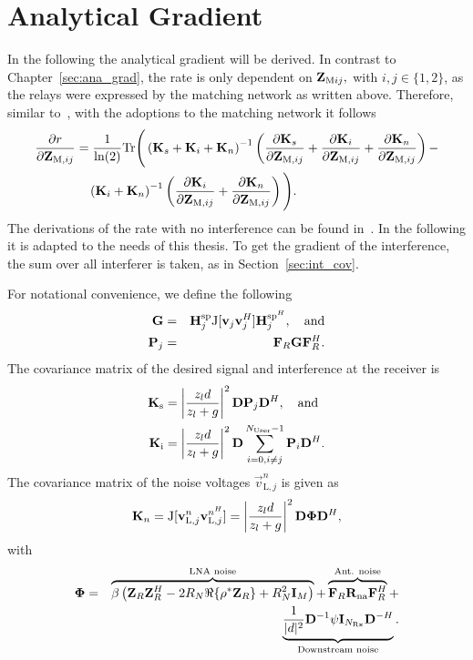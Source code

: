 \section{Analytical Gradient}
In the following the analytical gradient will be derived.
In contrast to Chapter~\ref{sec:ana_grad}, the rate is only dependent on $\mathbf{Z}_{\text{M}ij},$ with $i,j\in\{1,2\}$, as the relays were expressed by the matching network as written above.
Therefore, similar to~\cite{Yahia2013}, with the adoptions to the matching network it follows
\begin{align}
\label{eq:gradient}\nonumber
\frac{\partial r}{\partial\mathbf{Z}_{\text{M},ij}} &= \frac{1}{\text{ln}(2)} 
\text{Tr}\Bigg(\left(\mathbf{K}_s + \mathbf{K}_i + \mathbf{K}_n\right)^{-1}
\left(\frac{\partial\mathbf{K}_s}{\partial\mathbf{Z}_{\text{M},ij}}+
 \frac{\partial\mathbf{K}_i}{\partial\mathbf{Z}_{\text{M},ij}}+
 \frac{\partial\mathbf{K}_n}{\partial\mathbf{Z}_{\text{M},ij}}\right)-\\
 &\quad\left(\mathbf{K}_i+\mathbf{K}_n\right)^{-1}
 \left(\frac{\partial\mathbf{K}_i}{\partial\mathbf{Z}_{\text{M},ij}}+
 	\frac{\partial\mathbf{K}_n}{\partial\mathbf{Z}_{\text{M},ij}}\right)\Bigg).
\end{align}
The derivations of the rate with no interference can be found in~\cite{Yahia2013}.
In the following it is adapted to the needs of this thesis.
To get the gradient of the interference, the sum over all interferer is taken, as in Section~\ref{sec:int_cov}.

For notational convenience, we define the following %
\begin{eqnarray}
\mathbf{G}&=&\mathbf{H}_j^{\text{sp}}\text{J}[\mathbf{v}_j\mathbf{v}_j^H]\mathbf{H}_j^{\text{sp}^H},\quad\text{and} \nonumber \\
\mathbf{P}_j&=&\mathbf{F}_R\mathbf{G}\mathbf{F}_R^H \label{eqX}.
\end{eqnarray}
The covariance matrix of the desired signal and interference at the receiver is
\begin{align}
\mathbf{K}_\text{s}&=\left|\frac{z_ld}{z_l+g}\right|^2\mathbf{D}\mathbf{P}_j\mathbf{D}^H,\quad\text{and}\\
\mathbf{K}_\text{i}&=\left|\frac{z_ld}{z_l+g}\right|^2\mathbf{D}\sum_{i=0,i\neq j}^{N_\text{User}-1}\mathbf{P}_i\mathbf{D}^H.
\label{CovSignal}
\end{align}
 The covariance matrix of the noise voltages $\vec{v}_{\text{L},j}^n$ is given as  
\begin{eqnarray}
\mathbf{K}_{n}=\text{J}[\mathbf{v}_{\text{L},j}^n\mathbf{v}_{\text{L},j}^{n^H}]= 
\left|\frac{z_ld}{z_l+g}\right|^2\mathbf{D}\mathbf{\Phi} \mathbf{D}^H ,
\label{NoiseCorr}
\end{eqnarray}
with
\begin{eqnarray}
\mathbf{\Phi} &=&
	\overbrace{ \beta\left(  \mathbf{Z}_{R}\mathbf{Z}_{R}^H-2R_N\Re\{ \rho^* \mathbf{Z}_{R}\}+R_N^2\mathbf{I}_M\right)}^{\text{LNA noise}}  +
	\overbrace{\mathbf{F}_R\mathbf{R}_{\text{na}}\mathbf{F}_R^H}^{\text{Ant. noise}} + \nonumber \\
	&& \underbrace{\frac{1}{|d|^2}\mathbf{D}^{-1}\psi\mathbf{I}_{N_\text{Rx}}\mathbf{D}^{{-H}}}_{\text{Downstream noise}}.
\label{eq9}
\end{eqnarray} 


